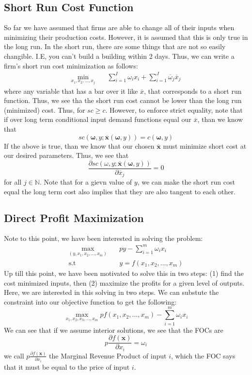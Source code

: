 \documentclass[12pt]{article}
\newcommand{\st}{\text{s.t}}
\newcommand{\N}{\mathbb{N}}
\begin{document}
\subsection{Short Run Cost Function}
So far we have assumed that firms are able to change all of their inputs when minimizing their production costs. However, it is assumed that this is only true in the long run. In the short run, there are some things that are not so easily changible. I.E, you can't build a building within 2 days. Thus, we can write a firm's short run cost minimization as follows:
\begin{align*}
    \min_{x_1, x_2, \dots, x_j} & \quad \sum_{i = 1}^{I} \omega_i x_i + \sum_{i = 1}^{J} \overline{\omega}_j \overline{x}_j 
\end{align*}
where any variable that has a bar over it like $\overline{x}$, that corresponds to a short run function. Thus, we see tha the short run cost cannot be lower than the long run (minimized) cost. Thus, for $sc \geq c$. However, to enforce strict equality, note that if over long term conditional input demand functions equal our $\overline{x}$, than we know that 
\[
sc(\mathbf{\omega}, y ; \mathbf{\overline{x}}(\mathbf{\omega}, y)) = c(\mathbf{\omega}, y)
\]
If the above is true, than we know that our chosen $\mathbf{\overline{x}}$ must minimize short cost at our desired parameters. Thus, we see that 
\[
\frac{\partial sc(\omega, y ; \mathbf{\overline{x}}(\mathbf{\omega}, y))}{\partial \overline{x}_j} = 0
\]
for all $j \in \N$. Note that for a gievn value of $y$, we can make the short run cost equal the long term cost also implies that they are also tangent to each other. 
\subsection{Direct Profit Maximization}
Note to this point, we have been interested in solving the problem:
\begin{align*}
    \max_{(y, x_1, x_2, \dots, x_m)} & \quad py - \sum_{i=1}^{m} \omega_i x_i\\
    \st & \quad y = f(x_1, x_2, \dots, x_m)
\end{align*}
Up till this point, we have been motivated to solve this in two steps: (1) find the cost minimized inputs, then (2) maximize the profits for a given level of outputs. Here, we are interested in this solving in two steps. We can substute the constraint into our objective function to get the following:
\[
\max_{x_1, x_2, x_3, \dots, x_m} pf(x_1, x_2, \dots, x_m) - \sum_{i = 1}^m \omega_i x_i
\]
We can see that if we assume interior solutions, we see that the FOCs are 
\[
p \frac{\partial f(\mathbf{x})}{\partial x_i} = \omega_i 
\]
we call $p \frac{\partial f(\mathbf{x})}{\partial x_i}$ the Marginal Revenue Product of input $i$, which the FOC says that it must be equal to the price of input $i$. 
\end{document}
